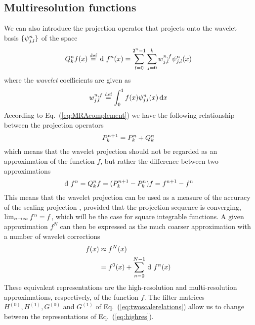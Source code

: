 \subsection{Multiresolution functions}
We can also introduce the projection operator  that projects
onto the wavelet basis $\lbrace\psi^n_{j,l}\rbrace$ of the space 
\begin{equation}
    \label{eq:wavelet_exp}
    \waveletproj{n}f(x) \mydef \waveletrep{f}{n}(x) =
    \sum_{l=0}^{2^n-1}\sum_{j=0}^k\waveletcoef^{n,f}_{j,l}\wavelet^n_{j,l}(x)
\end{equation}
where the \emph{wavelet} coefficients are given as
\begin{equation}
    \label{eq:wavelet_coef}
    w^{n,f}_{j,l} \stackrel{\text{def}}{\hbox{=}} \int_0^1f(x)\psi^n_{j,l}(x)\,\mathrm{d} x
\end{equation}
According to Eq.~(\ref{eq:MRAcomplement}) we have the following relationship 
between the projection operators
\begin{equation}
    \label{eq:proj_rel}
    {P}_{k}^{n+1} = {P}_{k}^{n} + {Q}_{k}^{n}
\end{equation}
which means that the wavelet projection should not be regarded as an approximation 
of the function $f$, but rather the difference between two approximations
\begin{equation}
    \waveletrep{f}{n} = \waveletproj{n} f = (\scalingproj{n+1}-\scalingproj{n})f = 
	\scalingrep{f}{n+1} - \scalingrep{f}{n}
\end{equation}
This means that the wavelet projection  can be used as a measure 
of the accuracy of the scaling projection , provided that the 
projection sequence is converging, $\lim_{n\rightarrow\infty} {f}^{n} = f$, 
which will be the case for square integrable functions\cite{Alpert:1993p5460}.
A given approximation $f^N$ can then be expressed as the much coarser 
approximation  with a number of wavelet corrections
\begin{align}
    \label{eq:highres}
    f(x)    &\approx \scalingrep{f}{N}(x)\\
    \label{eq:multires}
	    &= \scalingrep{f}{0}(x) + \sum_{n=0}^{N-1} \waveletrep{f}{n}(x)
\end{align}
These equivalent representations are the high-resolution and multi-resolution 
approximations, respectively, of the function $f$. The filter matrices $H^{(0)}, 
H^{(1)}, G^{(0)}$ and $G^{(1)}$ of Eq.~(\ref{eq:twoscalerelations}) allow us to 
change between the representations of Eq.~(\ref{eq:highres}).

